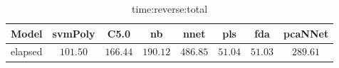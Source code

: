 \begin{table}[!ht]
	\centering
	\begin{tabular}{|c|c|c|c|c|c|c|c|}
		\hline
		Model & svmPoly & C5.0 & nb & nnet & pls & fda & pcaNNet \\ \hline
		elapsed & $101.50$ & $166.44$ & $190.12$ & $486.85$ & $51.04$ & $51.03$ & $289.61$ \\ \hline
	\end{tabular}
	\caption{time:reverse:total}
	\label{tab:time:reverse:total}
\end{table}
